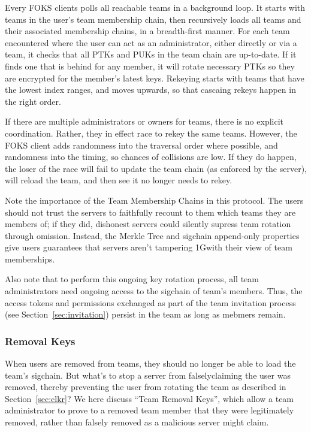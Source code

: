 Every FOKS clients polls all reachable teams in a background loop. It starts 
with teams in the user's team membership chain, then recursively loads all teams
and their associated membership chains, in a breadth-first manner.  For each
team encountered where the user can act as an administrator, either directly or
via a team, it checks that all PTKs and PUKs in the team chain are up-to-date.
If it finds one that is behind for any member, it will rotate necessary PTKs so
they are encrypted for the member's latest keys. Rekeying starts with teams
that have the lowest index ranges, and moves upwards, so that cascaing rekeys
happen in the right order.

If there are multiple administrators or owners for teams, there is no explicit
coordination. Rather, they in effect race to rekey the same teams.  However, the
FOKS client adds randomness into the traversal order where possible, and
randomness into the timing, so chances of collisions are low. If they do happen,
the loser of the race will fail to update the team chain (as enforced by the
server), will reload the team, and then see it no longer needs to rekey.

Note the importance of the Team Membership Chains in this protocol. The
users should not trust the servers to faithfully recount to them which
teams they are members of; if they did, dishonest servers could silently
supress team rotation through omission. Instead, the Merkle Tree and sigchain
append-only properties give users guarantees that servers aren't tampering
1Gwith their view of team memberships.

Also note that to perform this ongoing key rotation process, all team
administrators need ongoing access to the sigchain of team's members. Thus, the
access tokens and permissions exchanged as part of the team invitation process
(see Section~\ref{sec:invitation}) persist in the team as long as mebmers
remain.

\subsubsection{Removal Keys}
\label{sec:removal-keys}

When users are removed from teams, they should no longer be able to load the team's
sigchain. But what's to stop a server from falselyclaiming the user was removed, thereby 
preventing the user from rotating the team as described in Section~\ref{sec:clkr}?
We here discuss ``Team Removal Keys'', which allow a team administrator to prove
to a removed team member that they were legitimately removed, rather than falsely
removed as a malicious server might claim.

